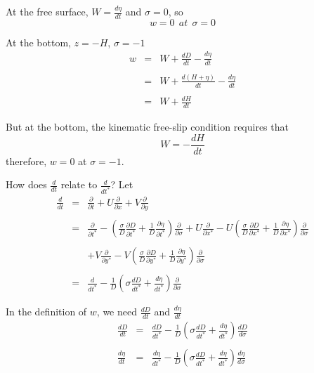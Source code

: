 \documentclass[oribibl]{llncs}
\begin{document}
At the free surface, $W=\frac{d \eta}{dt}$ and $\sigma=0$, so
\begin{equation}  
w = 0 \ \ at \ \ \sigma = 0
\end{equation}  

At the bottom, $z=-H$, $\sigma=-1$
\begin{eqnarray}  
w &=& W+ \frac{d D}{d t} -\frac{d \eta}{d t}  \nonumber \\ \nonumber \\ 
&=& W+ \frac{d (H+\eta)}{d t} -\frac{d \eta}{d t}  \nonumber \\ \nonumber \\ 
&=& W+ \frac{d H}{d t} 
\end{eqnarray}  

But at the bottom, the kinematic free-slip condition requires that
\begin{equation}  
W = - \frac{d H}{d t} 
\end{equation}  
therefore, $w=0$ at $\sigma=-1$.

How does $\frac{d}{dt}$ relate to $\frac{d}{d t^*}$? Let
\begin{eqnarray}  
\frac{d}{dt} &=& \frac{\partial}{\partial t} + U\frac{\partial}{\partial x} +V\frac{\partial}{\partial  y}  \nonumber \\ \nonumber \\ 
&=& \frac{\partial}{\partial t^*} - \left(  \frac{\sigma}{D} \frac{\partial D}{\partial t^*} + \frac{1}{D}\frac{\partial \eta}{\partial t^*}\right) \frac{\partial}{\partial \sigma} + U \frac{\partial}{\partial x^*} - U \left(  \frac{\sigma}{D} \frac{\partial D}{\partial x^*} + \frac{1}{D}\frac{\partial \eta}{\partial x^*}\right) \frac{\partial}{\partial \sigma} \nonumber \\ \nonumber \\ 
&& + V \frac{\partial}{\partial y^*} - V \left(  \frac{\sigma}{D} \frac{\partial D}{\partial y^*} + \frac{1}{D}\frac{\partial \eta}{\partial y^*}\right) \frac{\partial}{\partial \sigma}  \nonumber \\ \nonumber \\
&=&\frac{d}{dt^*} -\frac{1}{D} \left( \sigma \frac{dD}{dt^*} +\frac{d \eta}{dt^*} \right) \frac{\partial}{\partial \sigma}
\end{eqnarray}  

In the definition of $w$, we need $\frac{dD}{dt}$ and $\frac{d \eta}{dt}$
\begin{eqnarray}  
\frac{d D}{d t} &=&\frac{dD}{dt^*} -\frac{1}{D}\left( \sigma \frac{dD}{dt^*} +\frac{d \eta}{dt^*} \right) \frac{d D}{d \sigma} \nonumber \\ \nonumber \\
\frac{d \eta}{d t} &=&\frac{d\eta}{dt^*} -\frac{1}{D}\left( \sigma \frac{dD}{dt^*} +\frac{d \eta}{dt^*} \right) \frac{d \eta}{d \sigma}
\end{eqnarray}  
\end{document}
